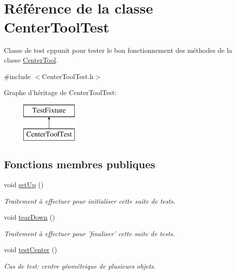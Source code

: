 \hypertarget{class_center_tool_test}{\section{Référence de la classe Center\-Tool\-Test}
\label{class_center_tool_test}
}


Classe de test cppunit pour tester le bon fonctionnement des méthodes de la classe \hyperlink{class_center_tool}{Center\-Tool}.  




{\ttfamily \#include $<$Center\-Tool\-Test.\-h$>$}

Graphe d'héritage de Center\-Tool\-Test\-:\begin{figure}[H]
\begin{center}
\leavevmode
\includegraphics[height=2.000000cm]{class_center_tool_test}
\end{center}
\end{figure}
\subsection*{Fonctions membres publiques}
\begin{DoxyCompactItemize}
\item 
void \hyperlink{group__inf2990_gab5443e5a7c8e3ddcd5bac53be6663244}{set\-Up} ()
\begin{DoxyCompactList}\small\item\em Traitement à effectuer pour initialiser cette suite de tests. \end{DoxyCompactList}\item 
void \hyperlink{group__inf2990_ga837ac366aa728e8f9536e950b9da3769}{tear\-Down} ()
\begin{DoxyCompactList}\small\item\em Traitement à effectuer pour 'finaliser' cette suite de tests. \end{DoxyCompactList}\item 
void \hyperlink{group__inf2990_gab0e6197c88a207aacfd8e9d178a53a47}{test\-Center} ()
\begin{DoxyCompactList}\small\item\em Cas de test\-: centre géométrique de plusieurs objets. \end{DoxyCompactList}\end{DoxyCompactItemize}


